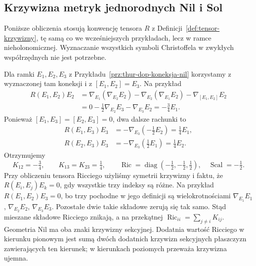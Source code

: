 \subsection*{Krzywizna metryk jednorodnych Nil i Sol}
\label{sec:thur-dop-krzywizna-nil-sol}
Poniższe obliczenia stosują konwencję tensora $R$ z
Definicji~\ref{def:tensor-krzywizny}, tę samą co we wcześniejszych
przykładach, lecz w ramce nieholonomicznej. Wyznaczanie
wszystkich symboli Christoffela w zwykłych współrzędnych
nie jest potrzebne.

\begin{przyklad}
\label{prz:thur-dop-krzywizna-nil}
Dla ramki $E_1,E_2,E_3$ z Przykładu~\ref{prz:thur-dop-koneksja-nil}
korzystamy z wyznaczonej tam koneksji i z $[E_1,E_2]=E_3$.
Na przykład
\[
\begin{aligned}
 R(E_1,E_2)E_2
 &=\nabla_{E_1}(\nabla_{E_2}E_2)
   -\nabla_{E_2}(\nabla_{E_1}E_2)
   -\nabla_{[E_1,E_2]}E_2\\
 &=0-\tfrac12\nabla_{E_2}E_3-\nabla_{E_3}E_2
 =-\tfrac34E_1.
\end{aligned}
\]
Ponieważ $[E_1,E_3]=[E_2,E_3]=0$, dwa dalsze rachunki to
\[
 \begin{aligned}
 R(E_1,E_3)E_3&=-\nabla_{E_3}(-\tfrac12E_2)=\tfrac14E_1,\\
 R(E_2,E_3)E_3&=-\nabla_{E_3}(\tfrac12E_1)=\tfrac14E_2.
 \end{aligned}
\]
Otrzymujemy
\[
 K_{12}=-\tfrac34,\qquad K_{13}=K_{23}=\tfrac14,
 \qquad \operatorname{Ric}
 =\operatorname{diag}(-\tfrac12,-\tfrac12,\tfrac12),
 \quad \operatorname{Scal}=-\tfrac12.
\]
Przy obliczeniu tensora Ricciego użyliśmy symetrii krzywizny i faktu,
że $R(E_i,E_j)E_k=0$, gdy wszystkie trzy indeksy są różne.
Na przykład $R(E_1,E_2)E_3=0$, bo trzy pochodne
w jego definicji są wielokrotnościami
$\nabla_{E_1}E_1$, $\nabla_{E_2}E_2$, $\nabla_{E_3}E_3$.
Pozostałe dwie takie składowe zerują się tak samo.
Stąd mieszane składowe Ricciego znikają, a na przekątnej
$\operatorname{Ric}_{ii}=\sum_{j\ne i}K_{ij}$.
Geometria Nil ma oba znaki krzywizny sekcyjnej. Dodatnia
wartość Ricciego w kierunku pionowym jest sumą dwóch
dodatnich krzywizn sekcyjnych płaszczyzn zawierających ten kierunek;
w kierunkach poziomych przeważa krzywizna ujemna.
\end{przyklad}

